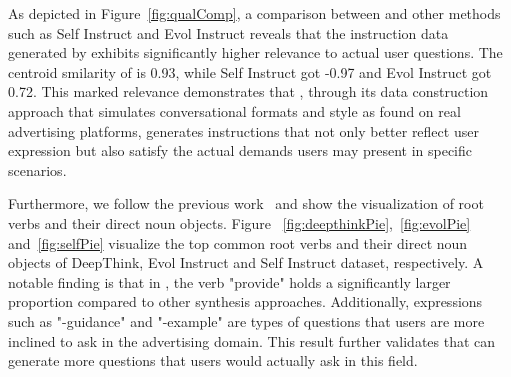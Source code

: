 As depicted in Figure~\ref{fig:qualComp}, a comparison between \ourmodel and other methods such as Self Instruct and Evol Instruct reveals that the instruction data generated by \ourmodel exhibits significantly higher relevance to actual user questions. The centroid smilarity of \ourmodel is 0.93, while Self Instruct got -0.97 and Evol Instruct got 0.72. This marked relevance demonstrates that \ourmodel, through its data construction approach that simulates conversational formats and style as found on real advertising platforms, generates instructions that not only better reflect user expression but also satisfy the actual demands users may present in specific scenarios.



Furthermore, we follow the previous work~\cite{xu2024magpie} and show the visualization of root verbs and their direct noun objects. Figure ~\ref{fig:deepthinkPie},~\ref{fig:evolPie} and~\ref{fig:selfPie} visualize the top common root verbs and their direct noun objects of DeepThink,  Evol Instruct and Self Instruct dataset, respectively.
A notable finding is that in \ourmodel, the verb "provide" holds a significantly larger proportion compared to other synthesis approaches. Additionally, expressions such as "-guidance" and "-example" are types of questions that users are more inclined to ask in the advertising domain. This result further validates that \ourmodel can generate more questions that users would actually ask in this field.


